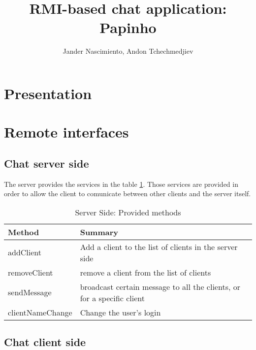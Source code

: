\documentclass[8pt,a4paper]{article}
\title {RMI-based chat application: Papinho}
\author{Jander Nascimiento, Andon Tchechmedjiev}
\begin{document}
\maketitle
\section{Presentation}
\section{Remote interfaces}
\subsection{Chat server side}

The server provides the services in the table \ref{tab:serverprovide}. Those services are provided in order to allow the client to comunicate between other clients and the server itself. 

  \begin{table}[H]
  \begin{center}
      \begin{tabular}{ | l | p{5cm} |}
      \hline
      Method & Summary \\ \hline
      addClient & Add a client to the list of clients in the server side \\ \hline 
      removeClient & remove a client from the list of clients \\ \hline
      sendMessage &  broadcast certain message to all the clients, or for a specific client\\ \hline
      clientNameChange & Change the user's login \\ \hline
      \end{tabular}
  \end{center}
  \caption{Server Side: Provided methods}
  \label{tab:serverprovide}
  \end{table}

\subsection{Chat client side}
\end{document}
